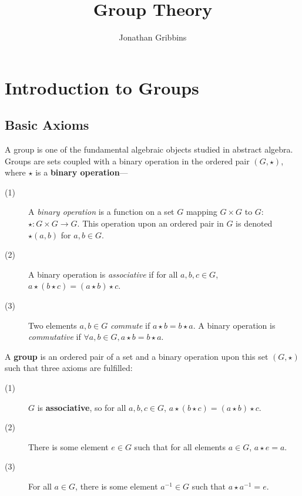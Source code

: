 \documentclass[12pt,letterpaper]{article}
\author{Jonathan Gribbins}
\title{Group Theory}
\date{}
\begin{document}
\maketitle

\tableofcontents

\pagebreak

\section{Introduction to Groups}

\subsection{Basic Axioms}

A group is one of the fundamental algebraic objects studied in abstract algebra. Groups are sets coupled with a binary operation in the ordered pair $(G, \star)$, where $\star$ is a \textbf{binary operation}---

\begin{description}
	\item[(1)] A \textit{binary operation} is a function on a set $G$ mapping $G \times G$ to $G$: $\star: G \times G \rightarrow G$. This operation upon an ordered pair in $G$ is denoted $\star (a, b)$ for $a, b \in G$.
	\item[(2)] A binary operation is \textit{associative} if for all $a, b, c \in G$, $a \star (b \star c) = (a \star b) \star c$.
	\item[(3)] Two elements $a, b \in G$ \textit{commute} if $a \star b = b \star a$. A binary operation is \textit{commutative} if $\forall a, b \in G, a \star b = b \star a$.
\end{description}

A \textbf{group} is an ordered pair of a set and a binary operation upon this set $(G, \star)$ such that three axioms are fulfilled:

\begin{description}
	\item[(1)] $G$ is \textbf{associative}, so for all $a, b, c \in G$, $a \star (b \star c) = (a \star b) \star c$.
	\item[(2)] There is some element $e \in G$ such that for all elements $a \in G$, $a \star e = a$.
	\item[(3)] For all $a \in G$, there is some element $a^{-1} \in G$ such that $a \star a^{-1} = e$.
\end{description}
\end{document}
